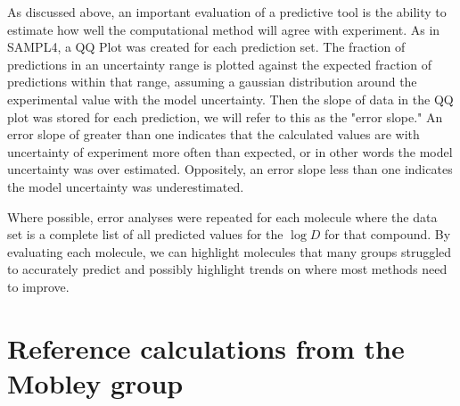 As discussed above, an important evaluation of a predictive tool is the ability to estimate how well the computational method will agree with experiment. %
As in SAMPL4, a QQ Plot %
was created for each prediction set. %
The fraction of predictions in an uncertainty range is plotted against the expected fraction of predictions within that range, assuming a gaussian distribution around the experimental value with the model uncertainty. %
Then the slope of data in the QQ plot was stored for each prediction, we will refer to this as the "error slope." %
An error slope of greater than one indicates that the calculated values are with uncertainty of experiment more often than expected, or in other words the model uncertainty was over estimated. 
Oppositely, an error slope less than one indicates the model uncertainty was underestimated. %

Where possible, error analyses were repeated for each molecule where the data set is a complete list of all predicted values for the $\log D$ for that compound.  %
By evaluating each molecule, we can highlight molecules that many groups struggled to accurately predict and possibly highlight trends on where most methods need to improve. 


\section{Reference calculations from the Mobley group} 
\label{methods:1}


